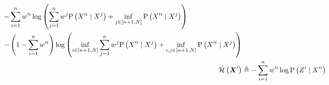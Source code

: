 \begin{lemma}
\begin{small}
\begin{subequations}
\begin{align}
\begin{split}
				&\phantomeq-\sum_{i=1}^n\weight{}{\prime i}\log\left(\sum_{j=1}^n\weight{}{j}\probcond{\states{}^{\prime i}}{\states{}^j}+\inf_{j\in[n+1,N]}\probcond{\states{}^{\prime i}}{\states{}^j}\right)\\
				& \phantomeq-\left(1-\sum_{i=1}^n\weight{}{\prime i}\right)\log\left(\inf_{i\in[n+1,N]}\sum_{j=1}^n\weight{}{j}\probcond{\states{}^{\prime i}}{\states{}^j}+\inf_{i,j\in[n+1,N]}\probcond{\states{}^{\prime i}}{\states{}^j}\right)
			\end{split}\\
			\simplentropy{\statesRV{}^\prime}{} & \triangleq-\sum_{i=1}^n\weight{}{\prime i}\log\probcond{\observations{}^\prime}{\states{}^{\prime i}}
		\end{align}
	\end{subequations}
	\end{small}
\end{lemma}
